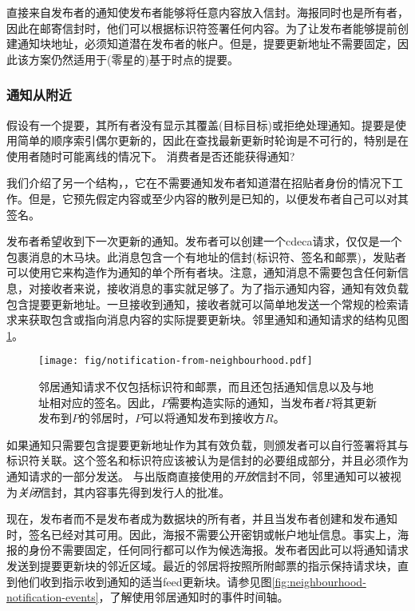 直接来自发布者的通知使发布者能够将任意内容放入信封。海报同时也是所有者，因此在邮寄信封时，他们可以根据标识符签署任何内容。为了让发布者能够提前创建通知块地址，必须知道潜在发布者的帐户。但是，提要更新地址不需要固定，因此该方案仍然适用于(零星的)基于时点的提要。

\subsubsection{通知从附近}

假设有一个提要，其所有者没有显示其覆盖(目标目标)或拒绝处理通知。提要是使用简单的顺序索引偶尔更新的，因此在查找最新更新时轮询是不可行的，特别是在使用者随时可能离线的情况下。
消费者是否还能获得通知?

我们介绍了另一个结构，，它在不需要通知发布者知道潜在招贴者身份的情况下工作。但是，它预先假定内容或至少内容的散列是已知的，以便发布者自己可以对其签名。


发布者希望收到下一次更新的通知。发布者可以创建一个cdeca请求，仅仅是一个包裹消息的木马块。此消息包含一个有地址的信封(标识符、签名和邮票)，发贴者可以使用它来构造作为通知的单个所有者块。注意，通知消息不需要包含任何新信息，对接收者来说，接收消息的事实就足够了。为了指示通知内容，通知有效负载包含提要更新地址。一旦接收到通知，接收者就可以简单地发送一个常规的检索请求来获取包含或指向消息内容的实际提要更新块。邻里通知和通知请求的结构见图\ref{fig:notification-from-neighbourhood}。
                                

\begin{figure}[htbp]
\centering
\texttt{[image: fig/notification-from-neighbourhood.pdf]}
\caption[社区通知\statusgreen]{邻居通知请求不仅包括标识符和邮票，而且还包括通知信息以及与地址相对应的签名。因此，$P$需要构造实际的通知，当发布者$F$将其更新发布到$P$的邻居时，$P$可以将通知发布到接收方$R$。}
\label{fig:notification-from-neighbourhood}
\end{figure}

如果通知只需要包含提要更新地址作为其有效负载，则颁发者可以自行签署将其与标识符关联。这个签名和标识符应该被认为是信封的必要组成部分，并且必须作为通知请求的一部分发送。
与出版商直接使用的\emph{开放}信封不同，邻里通知可以被视为\emph{关闭}信封，其内容事先得到发行人的批准。

现在，发布者而不是发布者成为数据块的所有者，并且当发布者创建和发布通知时，签名已经对其可用。因此，海报不需要公开密钥或帐户地址信息。事实上，海报的身份不需要固定，任何同行都可以作为候选海报。发布者因此可以将通知请求发送到提要更新块的邻近区域。最近的邻居将按照所附邮票的指示保持请求块，直到他们收到指示收到通知的适当feed更新块。请参见图\ref{fig:neighbourhood-notification-events}，了解使用邻居通知时的事件时间轴。

